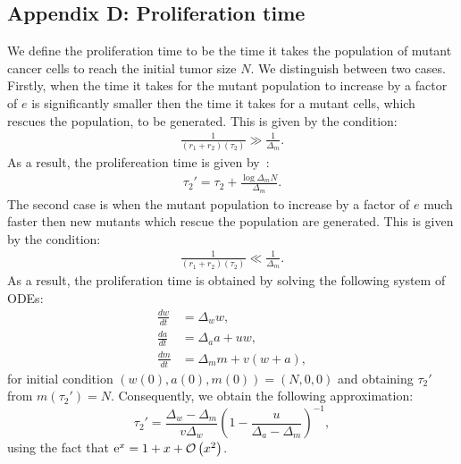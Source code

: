 \documentclass[12pt]{extarticle}
\newcommand{\e}{{\rm e}}
\begin{document}
\begin{appendices}
\section*{Appendix D: Proliferation time}
We define the proliferation time to be the time it takes the population of mutant cancer cells to reach the initial tumor size $N$. We distinguish between two cases. Firstly, when the time it takes for the mutant population to increase by a factor of $e$ is significantly smaller then the time it takes for a mutant cells, which rescues the population, to be generated. This is given by the condition:
\begin{align*}
\frac{1}{\left(r_1+r_2\right)\left(\tau_2\right)}\gg\frac{1}{\Delta_m}.
\end{align*}
As a result, the prolifereation time is given by~\citep{pompei2023fitness}:
\begin{align}
\tau_2'=\tau_2+\frac{\log \Delta_mN}{\Delta_m}.
\end{align}
The second case is when the mutant population to increase by a factor of $e$ much faster then new mutants which rescue the population are generated. This is given by the condition:
\begin{align*}
\frac{1}{\left(r_1+r_2\right)\left(\tau_2\right)}\ll\frac{1}{\Delta_m}.
\end{align*}
As a result, the proliferation time is obtained by solving the following system of ODEs:
\begin{align*}
\frac{dw}{dt}&=\Delta_ww,\\
\frac{da}{dt}&=\Delta_aa+uw,\\
\frac{dm}{dt}&=\Delta_mm+v\left(w+a\right),
\end{align*}
for initial condition $\left(w(0), a(0), m(0)\right)=\left(N,0,0\right)$ and obtaining $\tau_2'$ from $m\left(\tau_2'\right)=N$. Consequently, we obtain the following approximation:
\begin{equation}
\tau_2'=\frac{\Delta_w-\Delta_m}{v\Delta_w}\left(1-\frac{u}{\Delta_a-\Delta_m}\right)^{-1},
\end{equation}
using the fact that $\e^{x}=1+x+\mathcal{O}\left(x^2\right)$.
%


\end{appendices}
\end{document}
